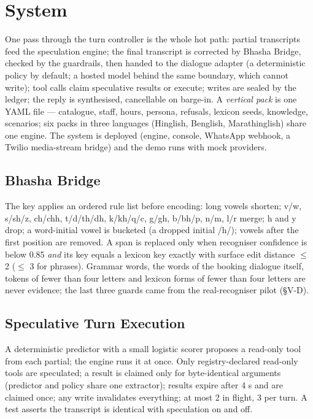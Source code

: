 \documentclass[conference]{IEEEtran}
\begin{document}
\section{System}

One pass through the turn controller is the whole hot path: partial transcripts feed the speculation engine; the final transcript is corrected by Bhasha Bridge, checked by the guardrails, then handed to the dialogue adapter (a deterministic policy by default; a hosted model behind the same boundary, which cannot write); tool calls claim speculative results or execute; writes are sealed by the ledger; the reply is synthesised, cancellable on barge-in. A \emph{vertical pack} is one YAML file --- catalogue, staff, hours, persona, refusals, lexicon seeds, knowledge, scenarios; six packs in three languages (Hinglish, Benglish, Marathinglish) share one engine. The system is deployed (engine, console, WhatsApp webhook, a Twilio media-stream bridge) and the demo runs with mock providers.

\subsection{Bhasha Bridge}

The key applies an ordered rule list before encoding: long vowels shorten; v/w, s/sh/z, ch/chh, t/d/th/dh, k/kh/q/c, g/gh, b/bh/p, n/m, l/r merge; h and y drop; a word-initial vowel is bucketed (a dropped initial /h/); vowels after the first position are removed. A span is replaced only when recogniser confidence is below 0.85 \emph{and} its key equals a lexicon key exactly with surface edit distance $\leq$ 2 ($\leq$ 3 for phrases). Grammar words, the words of the booking dialogue itself, tokens of fewer than four letters and lexicon forms of fewer than four letters are never evidence; the last three guards came from the real-recogniser pilot (\S{}V-D).

\subsection{Speculative Turn Execution}

A deterministic predictor with a small logistic scorer proposes a read-only tool from each partial; the engine runs it at once. Only registry-declared read-only tools are speculated; a result is claimed only for byte-identical arguments (predictor and policy share one extractor); results expire after 4 s and are claimed once; any write invalidates everything; at most 2 in flight, 3 per turn. A test asserts the transcript is identical with speculation on and off.
\end{document}
